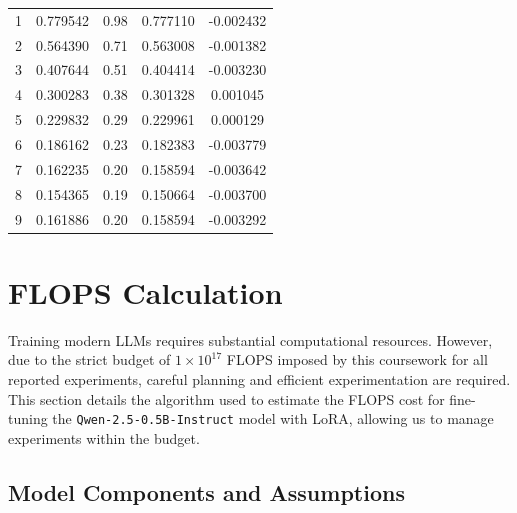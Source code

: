 \documentclass{article}
\begin{document}
\begin{table}[!thbp]
\begin{minipage}{0.48\textwidth}
\begin{tabular}{ccccc}
        1 & 0.779542 & 0.98 & 0.777110 & -0.002432 \\
        2 & 0.564390 & 0.71 & 0.563008 & -0.001382 \\
        3 & 0.407644 & 0.51 & 0.404414 & -0.003230 \\
        4 & 0.300283 & 0.38 & 0.301328 & 0.001045 \\
        5 & 0.229832 & 0.29 & 0.229961 & 0.000129 \\
        6 & 0.186162 & 0.23 & 0.182383 & -0.003779 \\
        7 & 0.162235 & 0.20 & 0.158594 & -0.003642 \\
        8 & 0.154365 & 0.19 & 0.150664 & -0.003700 \\
        9 & 0.161886 & 0.20 & 0.158594 & -0.003292 \\
        \bottomrule
    \end{tabular}
\end{minipage}
\end{table}






\section{FLOPS Calculation}
\label{sec:flops}

Training modern LLMs requires substantial computational resources. However, due to the strict budget of $1 \times 10^{17}$ FLOPS imposed by this coursework for all reported experiments, careful planning and efficient experimentation are required. This section details the algorithm used to estimate the FLOPS cost for fine-tuning the \texttt{Qwen-2.5-0.5B-Instruct} model with LoRA, allowing us to manage experiments within the budget.

\subsection{Model Components and Assumptions}
\end{document}
